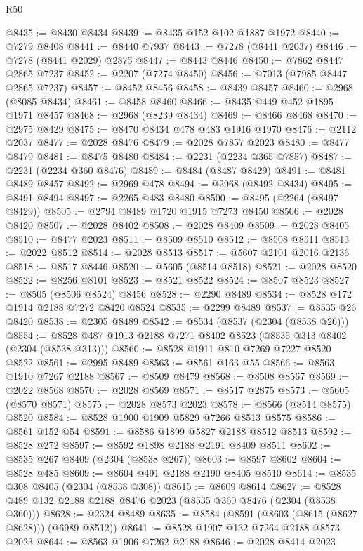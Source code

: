 \begin{lexlean}{R50}
\begin{coremodule}
@8435 := @8430 @8434
@8439 := @8435 @152 @102 @1887 @1972
@8440 := @7279 @8408
@8441 := @8440 @7937
@8443 := @7278 (@8441 @2037)
@8446 := @7278 (@8441 @2029) @2875
@8447 := @8443 @8446
@8450 := @7862 @8447 @2865 @7237
@8452 := @2207 (@7274 @8450)
@8456 := @7013 (@7985 @8447 @2865 @7237)
@8457 := @8452 @8456
@8458 := @8439 @8457
@8460 := @2968 (@8085 @8434)
@8461 := @8458 @8460
@8466 := @8435 @449 @452 @1895 @1971 @8457
@8468 := @2968 (@8239 @8434)
@8469 := @8466 @8468
@8470 := @2975 @8429
@8475 := @8470 @8434 @478 @483 @1916 @1970
@8476 := @2112 @2037
@8477 := @2028 @8476
@8479 := @2028 @7857 @2023
@8480 := @8477 @8479
@8481 := @8475 @8480
@8484 := @2231 (@2234 @365 @7857)
@8487 := @2231 (@2234 @360 @8476)
@8489 := @8484 (@8487 @8429)
@8491 := @8481 @8489 @8457
@8492 := @2969 @478
@8494 := @2968 (@8492 @8434)
@8495 := @8491 @8494
@8497 := @2265 @483 @8480
@8500 := @8495 (@2264 (@8497 @8429))
@8505 := @2794 @8489 @1720 @1915 @7273 @8450
@8506 := @2028 @8420
@8507 := @2028 @8402
@8508 := @2028 @8409
@8509 := @2028 @8405
@8510 := @8477 @2023
@8511 := @8509 @8510
@8512 := @8508 @8511
@8513 := @2022 @8512
@8514 := @2028 @8513
@8517 := @5607 @2101 @2016 @2136
@8518 := @8517 @8446
@8520 := @5605 (@8514 @8518)
@8521 := @2028 @8520
@8522 := @8256 @8101
@8523 := @8521 @8522
@8524 := @8507 @8523
@8527 := @8505 (@8506 @8524) @8456
@8528 := @2290 @8489
@8534 := @8528 @172 @1914 @2188 @7272 @8420 @8524
@8535 := @2299 @8489
@8537 := @8535 @26 @8420
@8538 := @2305 @8489
@8542 := @8534 (@8537 (@2304 (@8538 @26)))
@8554 := @8528 @487 @1913 @2188 @7271 @8402 @8523 (@8535 @313 @8402 (@2304 (@8538 @313)))
@8560 := @8528 @1911 @810 @7269 @7227 @8520 @8522
@8561 := @2995 @8489
@8563 := @8561 @163 @55
@8566 := @8563 @1910 @7267 @2188
@8567 := @8509 @8479
@8568 := @8508 @8567
@8569 := @2022 @8568
@8570 := @2028 @8569
@8571 := @8517 @2875
@8573 := @5605 (@8570 @8571)
@8575 := @2028 @8573 @2023
@8578 := @8566 (@8514 @8575) @8520
@8584 := @8528 @1900 @1909 @5829 @7266 @8513 @8575
@8586 := @8561 @152 @54
@8591 := @8586 @1899 @5827 @2188 @8512 @8513
@8592 := @8528 @272
@8597 := @8592 @1898 @2188 @2191 @8409 @8511
@8602 := @8535 @267 @8409 (@2304 (@8538 @267))
@8603 := @8597 @8602
@8604 := @8528 @485
@8609 := @8604 @491 @2188 @2190 @8405 @8510
@8614 := @8535 @308 @8405 (@2304 (@8538 @308))
@8615 := @8609 @8614
@8627 := @8528 @489 @132 @2188 @2188 @8476 @2023 (@8535 @360 @8476 (@2304 (@8538 @360)))
@8628 := @2324 @8489
@8635 := @8584 (@8591 (@8603 (@8615 (@8627 @8628))) (@6989 @8512))
@8641 := @8528 @1907 @132 @7264 @2188 @8573 @2023
@8644 := @8563 @1906 @7262 @2188
@8646 := @2028 @8414 @2023

\end{coremodule}
\end{lexlean}
